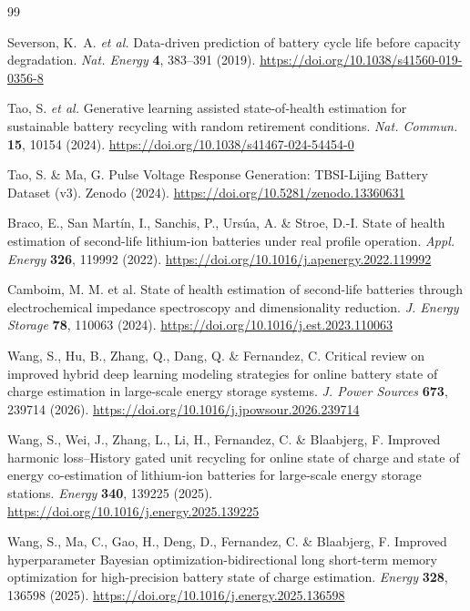 \documentclass[11pt]{article}
\begin{document}
\begin{thebibliography}{99}

Severson, K.~A. \emph{et al.} Data-driven prediction of battery cycle life before capacity degradation. \emph{Nat. Energy} \textbf{4}, 383--391 (2019). \url{https://doi.org/10.1038/s41560-019-0356-8}

Tao, S. \emph{et al.} Generative learning assisted state-of-health estimation for sustainable battery recycling with random retirement conditions. \emph{Nat. Commun.} \textbf{15}, 10154 (2024). \url{https://doi.org/10.1038/s41467-024-54454-0}

Tao, S. \& Ma, G. Pulse Voltage Response Generation:
TBSI-Lijing Battery Dataset (v3). Zenodo (2024).
\url{https://doi.org/10.5281/zenodo.13360631}

Braco, E., San Mart\'in, I., Sanchis, P., Urs\'ua, A. \& Stroe, D.-I.
State of health estimation of second-life lithium-ion batteries under
real profile operation.
\emph{Appl. Energy} \textbf{326}, 119992 (2022).
\url{https://doi.org/10.1016/j.apenergy.2022.119992}

Camboim, M. M. et al.
State of health estimation of second-life batteries through
electrochemical impedance spectroscopy and dimensionality reduction.
\emph{J. Energy Storage} \textbf{78}, 110063 (2024).
\url{https://doi.org/10.1016/j.est.2023.110063}

Wang, S., Hu, B., Zhang, Q., Dang, Q. \& Fernandez, C.
Critical review on improved hybrid deep learning modeling strategies for
online battery state of charge estimation in large-scale energy storage systems.
\emph{J. Power Sources} \textbf{673}, 239714 (2026).
\url{https://doi.org/10.1016/j.jpowsour.2026.239714}

Wang, S., Wei, J., Zhang, L., Li, H., Fernandez, C. \& Blaabjerg, F.
Improved harmonic loss--History gated unit recycling for online state of
charge and state of energy co-estimation of lithium-ion batteries for
large-scale energy storage stations.
\emph{Energy} \textbf{340}, 139225 (2025).
\url{https://doi.org/10.1016/j.energy.2025.139225}

Wang, S., Ma, C., Gao, H., Deng, D., Fernandez, C. \& Blaabjerg, F.
Improved hyperparameter Bayesian optimization-bidirectional long short-term
memory optimization for high-precision battery state of charge estimation.
\emph{Energy} \textbf{328}, 136598 (2025).
\url{https://doi.org/10.1016/j.energy.2025.136598}


\end{thebibliography}
\end{document}
